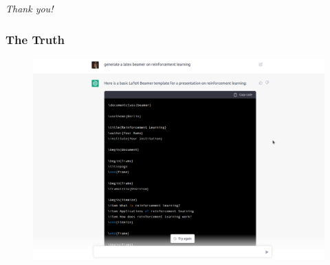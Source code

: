 \documentclass{beamer}
\begin{document}
\begin{frame}
    \centering \Large
    \emph{Thank you!}
\end{frame}

\begin{frame}
    \frametitle{The Truth}
    \begin{figure}[H]
        \includegraphics[width=\linewidth]{chatgpt.png}
      \end{figure}
    
\end{frame}
\end{document}
